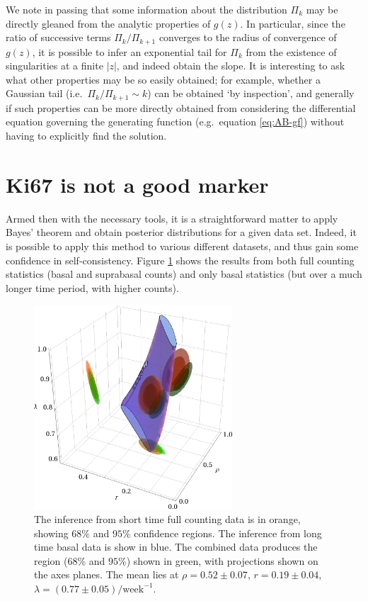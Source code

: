\documentclass[10pt,english]{report}
\begin{document}
We note in passing that some information about the distribution $\Pi_k$ may be directly gleaned from the analytic properties of $g(z)$. In particular, since the ratio of successive terms $\Pi_{k} / \Pi_{k+1}$ converges to the radius of convergence of $g(z)$, it is possible to infer an exponential tail for $\Pi_k$ from the existence of singularities at a finite $\left| z \right|$, and indeed obtain the slope. It is interesting to ask what other properties may be so easily obtained; for example, whether a Gaussian tail (i.e.\ $\Pi_{k} / \Pi_{k+1} \sim k$) can be obtained `by inspection', and generally if such properties can be more directly obtained from considering the differential equation governing the generating function (e.g.\ equation \eqref{eq:AB-gf}) without having to explicitly find the solution.

\section{\label{sec:ki67}Ki67 is not a good marker}

Armed then with the necessary tools, it is a straightforward matter to apply Bayes' theorem and obtain posterior distributions for a given data set. Indeed, it is possible to apply this method to various different datasets, and thus gain some confidence in self-consistency. Figure \ref{fig:oes-inference-result} shows the results from both full counting statistics (basal and suprabasal counts) and only basal statistics (but over a much longer time period, with higher counts).

\begin{figure}[htb]
	\centering
	\includegraphics[height=3in]{oes-combined-prior.png}
	\caption{\label{fig:oes-inference-result}The inference from short time full counting data is in orange, showing $68\%$ and $95\%$ confidence regions. The inference from long time basal data is show in blue. The combined data produces the region (68\% and $95\%$) shown in green, with projections shown on the axes planes. The mean lies at $\rho = 0.52 \pm 0.07$, $r = 0.19 \pm 0.04$, $\lambda = (0.77 \pm 0.05) /\textrm{week}^{-1}$.}
\end{figure}
\end{document}
